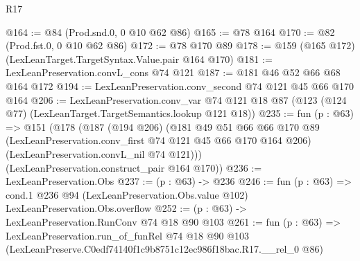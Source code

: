 \begin{lexlean}{R17}
\begin{coremodule}
@164 := @84 (Prod.snd.{0, 0} @10 @62 @86)
@165 := @78 @164
@170 := @82 (Prod.fst.{0, 0} @10 @62 @86)
@172 := @78 @170 @89
@178 := @159 (@165 @172) (LexLeanTarget.TargetSyntax.Value.pair @164 @170)
@181 := LexLeanPreservation.convL_cons @74 @121
@187 := @181 @46 @52 @66 @68 @164 @172
@194 := LexLeanPreservation.conv_second @74 @121 @45 @66 @170 @164
@206 := LexLeanPreservation.conv_var
    @74
    @121
    @18
    @87
    (@123 (@124 @77) (LexLeanTarget.TargetSemantics.lookup @121 @18))
@235 := fun (p : @63) =>
  @151
    (@178
      (@187
        (@194 @206)
        (@181
          @49
          @51
          @66
          @66
          @170
          @89
          (LexLeanPreservation.conv_first @74 @121 @45 @66 @170 @164 @206)
          (LexLeanPreservation.convL_nil @74 @121)))
      (LexLeanPreservation.construct_pair @164 @170))
@236 := LexLeanPreservation.Obs
@237 := (p : @63) -> @236
@246 := fun (p : @63) =>
  cond.{1} @236 @94 (LexLeanPreservation.Obs.value @102) LexLeanPreservation.Obs.overflow
@252 := (p : @63) -> LexLeanPreservation.RunConv @74 @18 @90 @103
@261 := fun (p : @63) =>
  LexLeanPreservation.run_of_funRel
    @74
    @18
    @90
    @103
    (LexLeanPreserve.C0edf74140f1c9b8751c12ec986f18bac.R17.__rel_0 @86)
\end{coremodule}
\end{lexlean}
